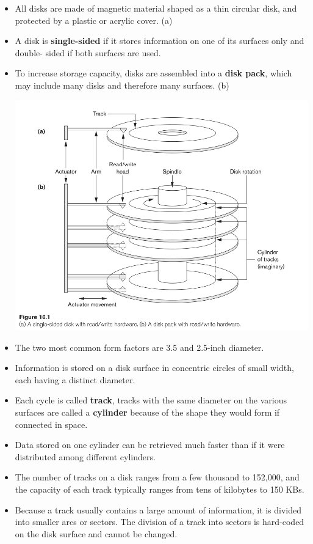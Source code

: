 \documentclass[10pt]{article}
\newcommand{\tf}{\textbf}
\begin{document}
\begin{itemize}
	\item All disks are made of magnetic material shaped as a thin circular disk, and protected by a plastic or acrylic cover. (a)
	\item A disk is \tf{single-sided} if it stores information on one of its surfaces only and {double- sided} if both surfaces are used. 
	\item To increase storage capacity, disks are assembled into a \tf{disk pack}, which may include many disks and therefore many surfaces. (b)
	
	\bigbreak
	\includegraphics[scale = 0.7]{disk.png}
	\bigbreak

	\item The two most common form factors are 3.5 and 2.5-inch diameter. 
	\item Information is stored on a disk surface in concentric circles of small width, each having a distinct diameter.
	\item Each cycle is called \tf{track}, tracks with the same diameter on the various surfaces are called a \tf{cylinder} because of the shape they would form if connected in space.
	\item Data stored on one cylinder can be retrieved much faster than if it were distributed among different cylinders. 
	\item The number of tracks on a disk ranges from a few thousand to 152,000, and the capacity of each track typically ranges from tens of kilobytes to 150 KBs.
	\item Because a track usually contains a large amount of information, it is divided into smaller arcs or sectors. The division of a track into sectors is hard-coded on the disk surface and cannot be changed.
	

\end{itemize}
\end{document}
